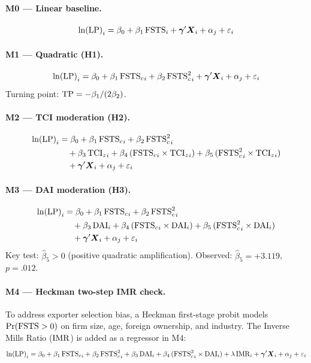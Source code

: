 \documentclass[smallextended]{svjour3}   %
\begin{document}
\paragraph{M0 --- Linear baseline.}
\begin{equation}
  {\ln(\mathrm{LP})}_{i} = \beta_{0} + \beta_{1}\,{\mathrm{FSTS}}_{i}
    + \boldsymbol{\gamma}'\boldsymbol{X}_{i} + {\alpha_{j}} + \varepsilon_{i}
  \label{eq:M0_p4}
\end{equation}

\paragraph{M1 --- Quadratic (H1).}
\begin{equation}
  {\ln(\mathrm{LP})}_{i} = \beta_{0} + \beta_{1}\,{\mathrm{FSTS}_{c}}_{i} + \beta_{2}\,{\mathrm{FSTS}_{c}^{2}}_{i}
    + \boldsymbol{\gamma}'\boldsymbol{X}_{i} + {\alpha_{j}} + \varepsilon_{i}
  \label{eq:M1_p4}
\end{equation}
Turning point: \(\mathrm{TP} = -\beta_{1}/(2\beta_{2})\).

\paragraph{M2 --- TCI moderation (H2).}
\begin{align}
  {\ln(\mathrm{LP})}_{i} &= \beta_{0} + \beta_{1}\,{\mathrm{FSTS}_{c}}_{i} + \beta_{2}\,{\mathrm{FSTS}_{c}^{2}}_{i}
    \notag \\
    &\quad + \beta_{3}\,{\mathrm{TCI}_{z}}_{i}
    + \beta_{4}\,({\mathrm{FSTS}_{c}}_{i} \times {\mathrm{TCI}_{z}}_{i})
    + \beta_{5}\,({\mathrm{FSTS}_{c}^{2}}_{i} \times {\mathrm{TCI}_{z}}_{i})
    \notag \\
    &\quad + \boldsymbol{\gamma}'\boldsymbol{X}_{i} + {\alpha_{j}} + \varepsilon_{i}
  \label{eq:M2_p4}
\end{align}

\paragraph{M3 --- DAI moderation (H3).}
\begin{align}
  {\ln(\mathrm{LP})}_{i} &= \beta_{0} + \beta_{1}\,{\mathrm{FSTS}_{c}}_{i} + \beta_{2}\,{\mathrm{FSTS}_{c}^{2}}_{i}
    \notag \\
    &\quad + \beta_{3}\,{\mathrm{DAI}}_{i}
    + \beta_{4}\,({\mathrm{FSTS}_{c}}_{i} \times {\mathrm{DAI}}_{i})
    + \beta_{5}\,({\mathrm{FSTS}_{c}^{2}}_{i} \times {\mathrm{DAI}}_{i})
    \notag \\
    &\quad + \boldsymbol{\gamma}'\boldsymbol{X}_{i} + {\alpha_{j}} + \varepsilon_{i}
  \label{eq:M3_p4}
\end{align}
Key test: \(\hat{\beta}_{5} > 0\) (positive quadratic amplification).
Observed: \(\hat{\beta}_{5} = +3.119\), \(p = .012\).

\paragraph{M4 --- Heckman two-step IMR check.}
To address exporter selection bias, a Heckman first-stage probit models
\(\Pr({\mathrm{FSTS}} > 0)\) on firm size, age, foreign ownership, and industry.
The Inverse Mills Ratio (\({\mathrm{IMR}}\)) is added as a regressor in M4:
\begin{equation}
  {\ln(\mathrm{LP})}_{i} = \beta_{0} + \beta_{1}\,{\mathrm{FSTS}_{c}}_{i} + \beta_{2}\,{\mathrm{FSTS}_{c}^{2}}_{i}
    + \beta_{3}\,{\mathrm{DAI}}_{i} + \beta_{4}\,({\mathrm{FSTS}_{c}^{2}}_{i} \times {\mathrm{DAI}}_{i})
    + \lambda\,{\mathrm{IMR}}_{i} + \boldsymbol{\gamma}'\boldsymbol{X}_{i} + {\alpha_{j}} + \varepsilon_{i}
  \label{eq:M4_p4}
\end{equation}
\end{document}
